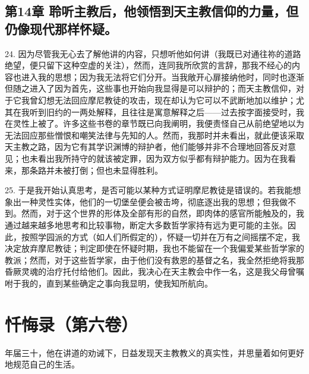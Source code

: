 \subsection{第14章 聆听主教后，他领悟到天主教信仰的力量，但仍像现代那样怀疑。}

24. 因为尽管我无心去了解他讲的内容，只想听他如何讲（我既已对通往祢的道路绝望，便只留下这种空虚的关注），然而，连同我所欣赏的言辞，那我不经心的内容也进入我的思想；因为我无法将它们分开。当我敞开心扉接纳他时，同时也逐渐但随之进入了因为首先，这些事也开始向我显得是可以辩护的；而天主教信仰，对于它我曾幻想无法回应摩尼教徒的攻击，现在却认为它可以不武断地加以维护；尤其在我听到旧约的一两处解释，且往往是寓意解释之后——过去按字面接受时，我在灵性上被了。许多这些书卷的章节既已向我阐明，我便责怪自己从前绝望地以为无法回应那些憎恨和嘲笑法律与先知的人。然而，我那时并未看出，就此便该采取天主教之路，因为它有其学识渊博的辩护者，他们能够并非不合理地回答反对意见；也未看出我所持守的就该被定罪，因为双方似乎都有辩护能力。因为在我看来，那条路并未被打倒；但也未显得胜利。\par

25. 于是我开始认真思考，是否可能以某种方式证明摩尼教徒是错误的。若我能想象出一种灵性实体，他们的一切堡垒便会被击垮，彻底逐出我的思想；但我做不到。然而，对于这个世界的形体及全部有形的自然，即肉体的感官所能触及的，我通过越来越多地思考和比较事物，断定大多数哲学家持有远为更可能的主张。因此，按照学园派的方式（如人们所假定的），怀疑一切并在万有之间摇摆不定，我决定放弃摩尼教徒；判定即使在怀疑时期，我也不能留在一个我偏爱某些哲学家的教派；然而，对于这些哲学家，由于他们没有救恩的基督之名，我全然拒绝将我那昏厥灵魂的治疗托付给他们。因此，我决心在天主教会中作一名，这是我父母曾嘱咐于我的，直到某些确定之事向我显明，使我知所航向。\par



\section{忏悔录（第六卷）}

年届三十，他在讲道的劝诫下，日益发现天主教教义的真实性，并思量着如何更好地规范自己的生活。\par

